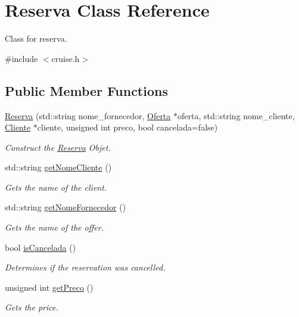 \hypertarget{classReserva}{}\section{Reserva Class Reference}
\label{classReserva}


Class for reserva.  




{\ttfamily \#include $<$cruise.\+h$>$}

\subsection*{Public Member Functions}
\begin{DoxyCompactItemize}
\item 
\hyperlink{classReserva_a96145a1381e9a9e5bb2091bb17e1d496}{Reserva} (std\+::string nome\+\_\+fornecedor, \hyperlink{classOferta}{Oferta} $\ast$oferta, std\+::string nome\+\_\+cliente, \hyperlink{classCliente}{Cliente} $\ast$cliente, unsigned int preco, bool cancelada=false)
\begin{DoxyCompactList}\small\item\em Construct the \hyperlink{classReserva}{Reserva} Objet. \end{DoxyCompactList}\item 
std\+::string \hyperlink{classReserva_a87b0465c8e9d2291d5dddd48fce24c38}{get\+Nome\+Cliente} ()
\begin{DoxyCompactList}\small\item\em Gets the name of the client. \end{DoxyCompactList}\item 
std\+::string \hyperlink{classReserva_ad54ef5f67fa096e711d2ab526db30bf3}{get\+Nome\+Fornecedor} ()
\begin{DoxyCompactList}\small\item\em Gets the name of the offer. \end{DoxyCompactList}\item 
bool \hyperlink{classReserva_a1fb3e7e1dfce5960dc888ac9929f014f}{is\+Cancelada} ()
\begin{DoxyCompactList}\small\item\em Determines if the reservation was cancelled. \end{DoxyCompactList}\item 
unsigned int \hyperlink{classReserva_a7d6a55cda46a28d62af5870c98cbc3d5}{get\+Preco} ()
\begin{DoxyCompactList}\small\item\em Gets the price. \end{DoxyCompactList}\end{DoxyCompactItemize}


